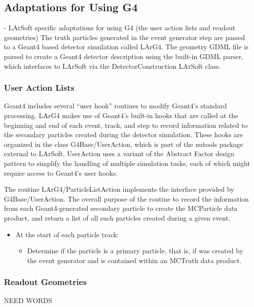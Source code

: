 \documentclass[12pt]{elsarticle}
\begin{document}
\subsection{Adaptations for Using G4}
- LArSoft specific adaptations for using G4 (the user action lists and readout geometries)
The truth particles generated in the event generator step are passed to a Geant4 based detector simulation called LArG4.  The geometry GDML file is parsed to create a Geant4 detector description using the built-in GDML parser, which interfaces to LArSoft via the DetectorConstruction LArSoft class.

\subsubsection{User Action Lists}
Geant4 includes several ``user hook'' routines to modify Geant4's
standard processing. LArG4 makes use of Geant4's built-in hooks that
are called at the beginning and end of each event, track, and step to
record information related to the secondary particles created during
the detector simulation. These hooks are organized in the class
G4Base/UserAction, which is part of the nutools package external to
LArSoft. UserAction uses a variant of the Abstract Factor design
pattern \cite{designpatterns} to simplify the handling of multiple
simulation tasks, each of which might require access to Geant4's user
hooks.

The routine LArG4/ParticleListAction implements the interface provided
by G4Base/UserAction. The overall purpose of the routine to record the
information from each Geant4-generated secondary particle to create
the MCParticle data product, and return a list of all such particles
created during a given event.

\begin{itemize}

\item At the start of each particle track:

  \begin {itemize}

  \item Determine if the particle is a primary particle, that is, if was created by the event generator and is contained within an MCTruth data product. 

  \end {itemize}

\end{itemize}

\subsubsection{Readout Geometries}
NEED WORDS
\end{document}
